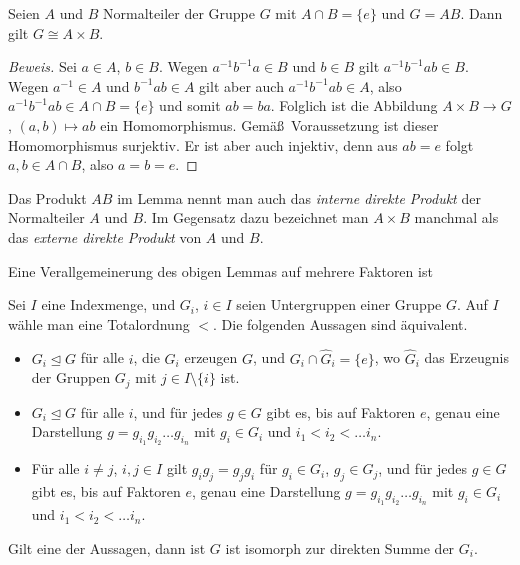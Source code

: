 \documentclass[12pt,a4paper,twoside]{article}
\begin{document}
  \begin{Lemma}
    Seien $A$ und $B$ Normalteiler der Gruppe $G$ mit $A\cap B=\{e\}$ und
    $G=AB$. Dann gilt $G\cong A\times B$.
  \end{Lemma}
  \begin{proof}[Beweis]
    Sei $a\in A$, $b\in B$. Wegen $a^{-1}b^{-1}a\in B$ und $b\in B$ gilt
    $a^{-1}b^{-1}ab\in B$. Wegen $a^{-1}\in A$ und $b^{-1}ab\in A$ gilt aber
    auch $a^{-1}b^{-1}ab\in A$, also $a^{-1}b^{-1}ab\in A\cap B=\{e\}$ und
    somit $ab=ba$. Folglich ist die Abbildung $A\times B\to G$, $(a,b)\mapsto
    ab$ ein Homomorphismus. Gem\"a\ss\ Voraussetzung ist dieser Homomorphismus
    surjektiv. Er ist aber auch injektiv, denn aus $ab=e$ folgt $a,b\in A\cap
    B$, also $a=b=e$.
  \end{proof}
  \begin{Bemerkung*}
    Das Produkt $AB$ im Lemma nennt man auch das \emph{interne direkte
    Produkt} der Normalteiler $A$ und
    $B$. Im Gegensatz dazu bezeichnet man $A\times B$ manchmal als das
    \emph{externe direkte Produkt} von $A$
    und $B$.
  \end{Bemerkung*}
Eine Verallgemeinerung des obigen Lemmas auf mehrere Faktoren ist
\begin{Satz}
  Sei $I$ eine Indexmenge, und $G_i$, $i\in I$ seien Untergruppen einer Gruppe
  $G$. Auf $I$ w\"ahle man eine Totalordnung $<$. Die folgenden Aussagen sind
  \"aquivalent.
  \begin{itemize}
\item[(a)] $G_i\trianglelefteq G$ f\"ur alle $i$, die $G_i$ erzeugen $G$, und
  $G_i\cap \hat G_i=\{e\}$, wo $\hat G_i$ das Erzeugnis der Gruppen $G_j$ mit
  $j\in I\setminus\{i\}$ ist.
\item[(b)] $G_i\trianglelefteq G$ f\"ur alle $i$, und f\"ur jedes $g\in G$
  gibt es, bis auf Faktoren $e$, genau eine Darstellung $g=g_{i_1}g_{i_2}\dots
  g_{i_n}$ mit $g_i\in G_i$ und $i_1<i_2<\dots i_n$.
\item[(c)] F\"ur alle $i\ne j$, $i,j\in I$ gilt $g_ig_j=g_jg_i$ f\"ur $g_i\in
  G_i$, $g_j\in G_j$, und f\"ur jedes $g\in G$ gibt es, bis auf Faktoren $e$,
  genau eine Darstellung $g=g_{i_1}g_{i_2}\dots g_{i_n}$ mit $g_i\in G_i$ und
  $i_1<i_2<\dots i_n$.
  \end{itemize}
  Gilt eine der Aussagen, dann ist $G$ ist isomorph zur direkten Summe der
  $G_i$.
\end{Satz}
\end{document}
